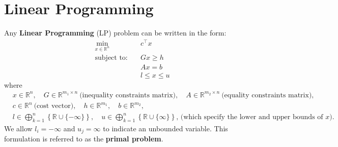 \documentclass[twoside,12pt,openright]{report}  %
\begin{document}



\section{Linear Programming}\label{sec:lp}
Any \textbf{Linear Programming} (LP) problem can be written in the form:
\[
\begin{aligned}
    \min_{x \in \mathbb{R}^n} \quad & c^\top x \\
    \text{subject to:} \quad & Gx \ge h \\
    & Ax = b \\
    & l \le x \le u
\end{aligned}
\]
where 
\[
\begin{aligned}
&x \in \mathbb{R}^n, \quad 
G \in \mathbb{R}^{m_1 \times n} \ \text{(inequality constraints matrix)}, \quad
A \in \mathbb{R}^{m_2 \times n} \ \text{(equality constraints matrix)}, \\
&c \in \mathbb{R}^n \ \text{(cost vector)}, \quad
h \in \mathbb{R}^{m_1}, \quad b \in \mathbb{R}^{m_2}, \\
&l \in \bigoplus_{k=1}^{n} \left\{ \mathbb{R} \cup \{-\infty\} \right\}, \quad
u \in \bigoplus_{k=1}^{n} \left\{ \mathbb{R} \cup \{\infty\} \right\} \text{, (which specify the lower and upper bounds of $x$).}\
\end{aligned}
\]
We allow $l_i = -\infty$ and $u_j = \infty$ to indicate an unbounded variable. This formulation is referred to as the \textbf{primal problem}.
\end{document}
